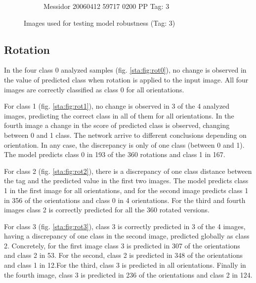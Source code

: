 \begin{figure}[ht!]
\begin{subfigure}[b]{0.4\textwidth}
		\caption{Messidor 20060412 59717 0200 PP Tag: 3}		
	\end{subfigure}
	\hfill 
	\caption{Images used for testing model robustness (Tag: 3)}  
	\label{sta:fig:imgs3} 
\end{figure}

\subsection{Rotation}

In the four class 0 analyzed samples (fig. \ref{sta:fig:rot0}), no change is observed in the value of predicted class when rotation is applied to the input image.  All four images are correctly classified as class 0 for all orientations. 

For class 1 (fig. \ref{sta:fig:rot1}), no change is observed in 3 of the 4 analyzed images, predicting the correct class in all of them for all orientations. In the fourth image a change in the score of predicted class is observed, changing between 0 and 1 class. The network arrive to different conclusions depending on orientation. In any case, the discrepancy is only of one class (between 0 and 1). The model predicts class 0 in 193 of the 360 rotations and class 1 in 167.

For class 2 (fig. \ref{sta:fig:rot2}), there is a discrepancy of one class distance between the tag and the predicted value in the first two images. The model predicts class 1 in the first image for all orientations, and for the second image predicts class 1 in 356 of the orientations and class 0 in 4 orientations. For the third and fourth images class 2 is correctly predicted for all the 360 rotated versions.

For class 3 (fig. \ref{sta:fig:rot3}), class 3 is correctly predicted in 3 of the 4 images, having a discrepancy of one class in the second image, predicted globally as class 2. Concretely, for the first image class 3 is predicted in 307 of the orientations and class 2 in 53. For the second, class 2 is predicted in 348 of the orientations and class 1 in 12.For the third, class 3 is predicted in all orientations. Finally in the fourth image, class 3 is predicted in 236 of the orientations and class 2 in 124.

